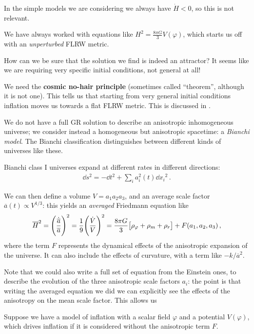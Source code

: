 \documentclass[main.tex]{subfiles}
\begin{document}
In the simple models we are considering we always have \(\dot{H} < 0 \), so this is not relevant. 

We have always worked with equations like \(H^2 = \frac{8 \pi G}{3} V(\varphi )\), which starts us off with an \emph{unperturbed} FLRW metric.

How can we be sure that the solution we find is indeed an attractor? It seems like we are requiring very specific initial conditions, not general at all! 

We need the \textbf{cosmic no-hair principle} (sometimes called ``theorem'', although it is not one).
This tells us that starting from very general initial conditions inflation moves us towards a flat FLRW metric. 
This is discussed in \textcite[]{kolbEarlyUniverse1994}. 

We do not have a full GR solution to describe an anisotropic inhomogeneous universe; we consider instead a homogeneous but anisotropic spacetime: a \emph{Bianchi model}. 
The Bianchi classification distinguishes between different kinds of universes like these. 

Bianchi class I universes expand at different rates in different directions: 
%
\begin{align}
\dd{s^2} = - \dd{t}^2 + \sum _{i} a_i^2 (t) \dd{x_i}^2
\,.
\end{align}

We can then define a volume \(V = a_1 a_2 a_3 \), and an average scale factor \(\overline{a} (t) \propto V^{1/3}\): this yields an \emph{averaged} Friedmann equation like 
%
\begin{align}
\overline{H}^2 = \qty(\frac{\dot{\overline{a}}}{\overline{a}})^2 = \frac{1}{9} \qty(\frac{\dot{V}}{V})^2
 = \frac{8 \pi G}{3} \qty[\rho _\varphi + \rho _m + \rho _r]
 + F(a_1, a_2, a_3 )
\,,
\end{align}
%
where the term \(F\) represents the dynamical effects of the anisotropic expansion of the universe. 
It can also include the effects of curvature, with a term like \(- k / \overline{a}^2\).

Note that we could also write a full set of equation from the Einstein ones, to describe the evolution of the three anisotropic scale factors \(a_i\): the point is that writing the averaged equation we did we can explicitly see the effects of the anisotropy on the mean scale factor. This allows us 

Suppose we have a model of inflation with a scalar field \(\varphi \) and a potential \(V(\varphi )\), which drives inflation if it is considered without the anisotropic term \(F\). 
\end{document}

